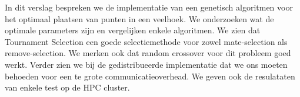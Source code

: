 In dit verslag bespreken we de implementatie van een genetisch algoritmen voor het optimaal plaatsen van punten in een veelhoek. We onderzoeken wat de optimale parameters zijn en vergelijken enkele algoritmen. We zien dat Tournament Selection een goede selectiemethode voor zowel mate-selection als remove-selection. We merken ook dat random crossover voor dit probleem goed werkt. Verder zien we bij de gedistribueerde implementatie dat we ons moeten behoeden voor een te grote communicatieoverhead. We geven ook de resulataten van enkele test op de HPC cluster.